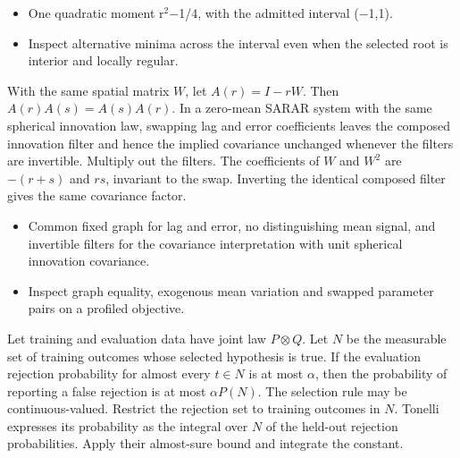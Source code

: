 \expandafter\def\csname statadic@assumptions@STATADIC-SPATIAL-005\endcsname{\begin{itemize}
\item One quadratic moment r\ensuremath{{}^2}\ensuremath{-}1/4, with the admitted interval (\ensuremath{-}1,1).
\end{itemize}}
\expandafter\def\csname statadic@diagnostics@STATADIC-SPATIAL-005\endcsname{\begin{itemize}
\item Inspect alternative minima across the interval even when the selected root is interior and locally regular.
\end{itemize}}
\expandafter\def\csname statadic@statement@STATADIC-SPATIAL-006\endcsname{With the same spatial matrix $W$, let $A(r)=I-rW$.
  Then $A(r)A(s)=A(s)A(r)$. In a zero-mean SARAR system with the same spherical
  innovation law, swapping lag and error coefficients leaves the composed
  innovation filter and hence the implied covariance unchanged whenever the filters are invertible.}
\expandafter\def\csname statadic@proof@STATADIC-SPATIAL-006\endcsname{Multiply out the filters. The coefficients of $W$ and $W^2$
  are $-(r+s)$ and $rs$, invariant to the swap. Inverting the identical
  composed filter gives the same covariance factor.}
\expandafter\def\csname statadic@assumptions@STATADIC-SPATIAL-006\endcsname{\begin{itemize}
\item Common fixed graph for lag and error, no distinguishing mean signal, and invertible filters for the covariance interpretation with unit spherical innovation covariance.
\end{itemize}}
\expandafter\def\csname statadic@diagnostics@STATADIC-SPATIAL-006\endcsname{\begin{itemize}
\item Inspect graph equality, exogenous mean variation and swapped parameter pairs on a profiled objective.
\end{itemize}}
\expandafter\def\csname statadic@statement@STATADIC-SELECTION-001\endcsname{Let training and evaluation data have joint law $P\otimes Q$.
  Let $N$ be the measurable set of training outcomes whose selected hypothesis
  is true. If the evaluation rejection probability for almost every $t\in N$
  is at most $\alpha$, then the probability of reporting a false rejection is
  at most $\alpha P(N)$. The selection rule may be continuous-valued.}
\expandafter\def\csname statadic@proof@STATADIC-SELECTION-001\endcsname{Restrict the rejection set to training outcomes in $N$.
  Tonelli expresses its probability as the integral over $N$ of the held-out
  rejection probabilities. Apply their almost-sure bound and integrate
  the constant.}
